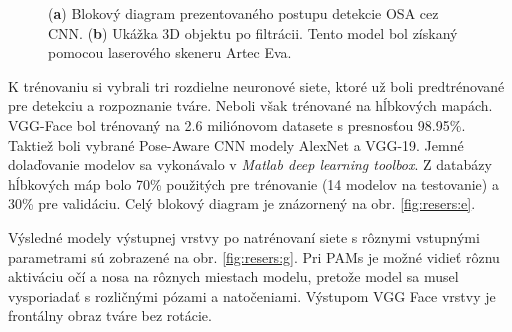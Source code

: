 \begin{figure}[h]
\begin{subfigure}[b]{0.37\textwidth}
		\caption{}
		\label{fig:resers:f}
	\end{subfigure}
	\caption{(\textbf{a}) Blokový diagram prezentovaného postupu detekcie OSA cez CNN. 
	(\textbf{b}) Ukážka 3D objektu po filtrácii. Tento model bol získaný pomocou laserového skeneru Artec Eva.} 
\label{fig:resers:2}
\end{figure}

K trénovaniu si vybrali tri rozdielne neuronové siete, ktoré už boli predtrénované pre detekciu a rozpoznanie tváre. Neboli však trénované na hĺbkových mapách.  VGG-Face bol trénovaný na 2.6 miliónovom datasete s presnosťou 98.95\%. Taktiež boli vybrané Pose-Aware CNN modely AlexNet a VGG-19. 
Jemné dolaďovanie modelov sa vykonávalo v \textit{Matlab deep learning toolbox}. Z databázy hĺbkových máp bolo 70\% použitých pre trénovanie (14 modelov na testovanie) a 30\% pre validáciu. Celý blokový diagram je znázornený na obr. \ref{fig:resers:e}. 

Výsledné modely výstupnej vrstvy po natrénovaní siete s rôznymi vstupnými parametrami sú zobrazené na obr. \ref{fig:resers:g}. Pri PAMs je možné vidieť rôznu aktiváciu očí a nosa na rôznych miestach modelu, pretože model sa musel vysporiadať s rozličnými pózami a natočeniami.  Výstupom VGG Face vrstvy je frontálny obraz tváre bez rotácie.

